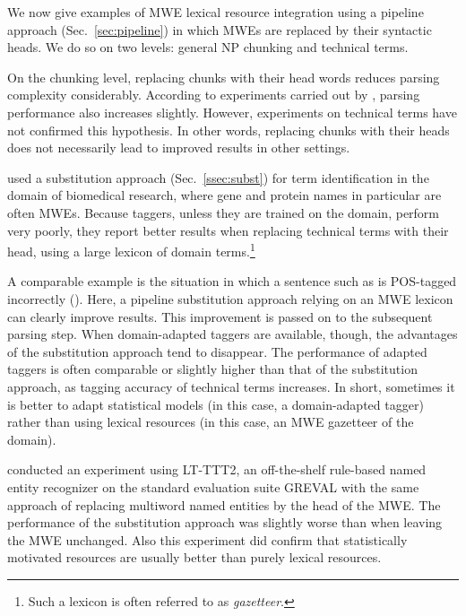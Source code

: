\documentclass[output=paper]{LSP/langsci}
\begin{document}
We now give examples of MWE lexical resource integration using a pipeline approach (Sec.~\ref{sec:pipeline}) in which MWEs are replaced by their syntactic heads. We do so on two levels: general NP chunking and technical terms.


On the chunking level, replacing chunks with their head words reduces parsing complexity considerably. 
According to experiments carried out by \citet{prins05}, parsing performance also increases slightly. 
However, experiments on technical terms have not confirmed this hypothesis.
In other words, replacing chunks with their heads does not necessarily lead to improved results in other settings. 


\citet{weeds-ea07} used a substitution approach (Sec.~\ref{ssec:subst}) for term identification in the domain of biomedical research, where gene and protein names in particular are often MWEs. Because taggers, unless they are trained on the domain, perform very poorly, they report better results when replacing technical terms with their head, using a large lexicon of domain terms.\footnote{Such a lexicon is often referred to as \emph{gazetteer}.}

A comparable example is the situation in which a sentence such as 
%
%
is POS-tagged incorrectly (). Here, a pipeline substitution approach relying on an MWE lexicon can clearly improve results. This improvement is passed on to the subsequent parsing step. 
When domain-adapted taggers are available, though, the advantages of the substitution approach tend to disappear. 
The performance of adapted taggers is often comparable or slightly higher than that of the substitution approach, as tagging accuracy of technical terms increases. 
In short, sometimes it is better to adapt statistical models (in this case, a domain-adapted tagger) rather than using lexical resources (in this case, an MWE gazetteer of the domain).%

\citet{schneider:2014} conducted an experiment using LT-TTT2, an off-the-shelf rule-based named entity recognizer \citep{grover08} on the standard evaluation suite GREVAL \citep{carroll-ea04} with the same approach of replacing multiword named entities by the head of the MWE. The performance of the substitution approach was slightly worse than when leaving the MWE unchanged. %
Also this experiment did confirm that statistically motivated resources are usually better than purely lexical resources.
\end{document}
